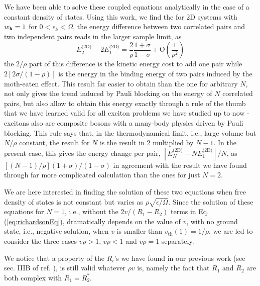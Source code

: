 \documentclass{article}
\newcommand{\td}{{\ensuremath{{\text{(2D)}}}}}
\begin{document}
We have been able to solve these coupled equations analytically in the case of a constant density of states\cite{combescotBCS}.  Using this work, we find the for 2D systems with $w_{\mathbf{k}}=1$ for $0<\epsilon_k<\Omega$, the energy difference between two correlated pairs and two independent pairs reads in the larger sample limit, as 
\begin{equation}
E^{\td}_2-2E_1^{\td}=\frac{2}{\rho}\frac{1+\sigma}{1-\sigma}+\text{O}(\frac{1}{\rho^2})
\label{eq:}
\end{equation}
the $2/\rho$ part of this difference is the kinetic energy cost to add one pair while $2[2\sigma/(1-\rho)]$ is the energy in the binding energy of two pairs induced by the moth-eaten effect. This result far easier to obtain than the one for arbitrary $N$, not only gives the trend induced by Pauli blocking on the energy of $N$ correlated pairs, but also allow to obtain this energy exactly through a rule of the thumb that we have learned valid for all exciton problems we have studied up to now - excitons also are composite bosons with a many-body physics driven by Pauli blocking.  This rule says that, in the thermodynamical limit, i.e., large volume but $N/\rho$ constant, the result for $N$ is the result in 2 multiplied by $N-1$.  In the present case, this gives the energy change per pair, $[E^{\td}_N-NE^{\td}_1]/N$, as $[(N-1)/\rho](1+\sigma)/(1-\sigma)$ in agreement with the result we have found through far more complicated calculation than the ones for just $N=2$.

We are here interested in finding the solution of these two equations when free density of states is not constant but varies as $\rho\sqrt{\epsilon/\Omega}$.  Since the solution of these equations for $N=1$, i.e., without the $2v/(R_1-R_2)$ terms in Eq. (\ref{eq:richardsonEq}), dramatically depends on the value of $v$, with no ground state, i.e., negative solution, when $v$ is smaller than $v_{\text{th}}(1)=1/\rho$, we are led to consider the three cases $v\rho>1$, $v\rho<1$ and $v\rho=1$ separately. 

We notice that a property of the $R_i$'s we have found in our previous work (see sec. IIIB of ref. \cite{combescotBCS}), is still valid whatever $\rho{}v$ is, namely the fact that $R_1$ and $R_2$ are both complex with $R_1=R_2^*$.%

\end{document}

